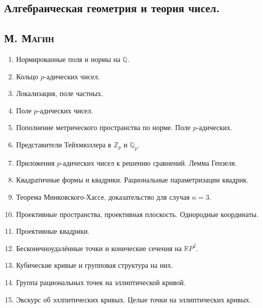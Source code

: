 \documentclass[12pt]{article}
\begin{document}
\begin{center}
    \section*{Алгебраическая геометрия и теория чисел.}
    \subsection*{\textsc{М. Магин}}
\end{center}

\begin{enumerate}
    \item Нормированные поля и нормы на $\mathbb{Q}$.
    \item Кольцо $p$-адических чисел.
    \item Локализация, поле частных.
    \item Поле $p$-адических чисел.
    \item Пополнение метрического пространства по норме. Поле $p$-адических.
    \item Представители Тейхмюллера в $\mathbb{Z}_p$ и $\mathbb{Q}_p$.
    \item Приложения $p$-адических чисел к решению сравнений. Лемма Гензеля.
    \item Квадратичные формы и квадрики. Рациональные параметризации квадрик.
    \item Теорема Минковского-Хассе, доказательство для случая $n = 3$.
    \item Проективные пространства, проективная плоскость. Однородные координаты.
    \item Проективные квадрики.
    \item Бесконечноудалённые точки и конические сечения на $\mathbb{R}P^2$.
    \item Кубические кривые и групповая структура на них.
    \item Группа рациональных точек на эллиптической кривой.
    \item Экскурс об эллпитических кривых. Целые точки на эллиптических кривых.
\end{enumerate}
\end{document}
